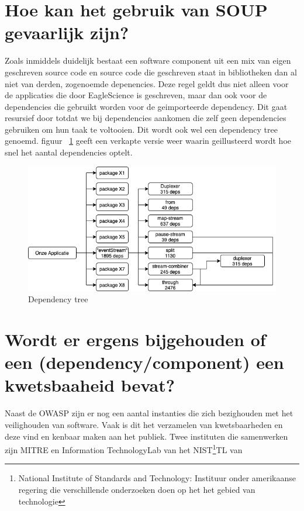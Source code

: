 \section{Hoe kan het gebruik van SOUP gevaarlijk zijn?}\label{sec:hoe-kan-het-gebruik-van-soup-gevaarlijk-zijn?}
Zoals inmiddels duidelijk bestaat een software component uit een mix van eigen geschreven source code en source code die geschreven staat in bibliotheken dan al niet van derden, zogenoemde depenencies. Deze regel geldt dus niet alleen voor de applicaties die door EagleScience is geschreven, maar dan ook voor de dependencies die gebruikt worden voor de geimporteerde dependency. Dit gaat resursief door totdat we bij dependencies aankomen die zelf geen dependencies gebruiken om hun taak te voltooien. Dit wordt ook wel een dependency tree genoemd. figuur ~\ref{fig:dependency-tree} geeft een verkapte versie weer waarin geillusteerd wordt hoe snel het aantal dependencies optelt.
\begin{figure}[H]
    \myfloatalign
    \includegraphics[width=12cm]{gfx/dependency-tree}
    \caption{Dependency tree}\label{fig:dependency-tree}
\end{figure}

\section{Wordt er ergens bijgehouden of een (dependency/component) een kwetsbaaheid bevat?}\label{sec:item-wordt-er-ergens-bijgehouden-of-een-dependency/component)-een-kwetsbaaheid-bevat?}
Naast de OWASP zijn er nog een aantal instanties die zich bezighouden met het veilighouden van software. Vaak is dit het verzamelen van kwetsbaarheden en deze vind en kenbaar maken aan het publiek. Twee instituten die samenwerken zijn MITRE en Information TechnologyLab van het NIST\footnote{National Institute of Standards and Technology: Instituur onder amerikaanse regering die verschillende onderzoeken doen op het het gebied van technologie}TL van

